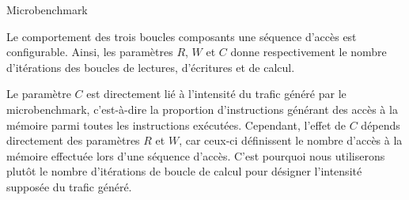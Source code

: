 	

\begin{algorithm}
\begin{algorithmic}


	  \EndFor
	  
	  \EndFor
	  
	  \EndFor
  \EndFor
\EndFunction

\end{algorithmic}
\caption{\label{alg:microbench} Microbenchmark}
\end{algorithm}

Le comportement des trois boucles composants une séquence d'accès est configurable.
Ainsi, les paramètres $R$, $W$ et $C$ donne respectivement le nombre d'itérations des boucles de lectures, d'écritures et de calcul.

Le paramètre $C$ est directement lié à l'intensité du trafic généré par le microbenchmark, c'est-à-dire la proportion d'instructions générant des accès à la mémoire parmi toutes les instructions exécutées.
Cependant, l'effet de $C$ dépends directement des paramètres $R$ et $W$, car ceux-ci définissent le nombre d'accès à la mémoire effectuée lors d'une séquence d'accès.
C'est pourquoi nous utiliserons plutôt le nombre d'itérations de boucle de calcul pour désigner l'intensité supposée du trafic généré.

